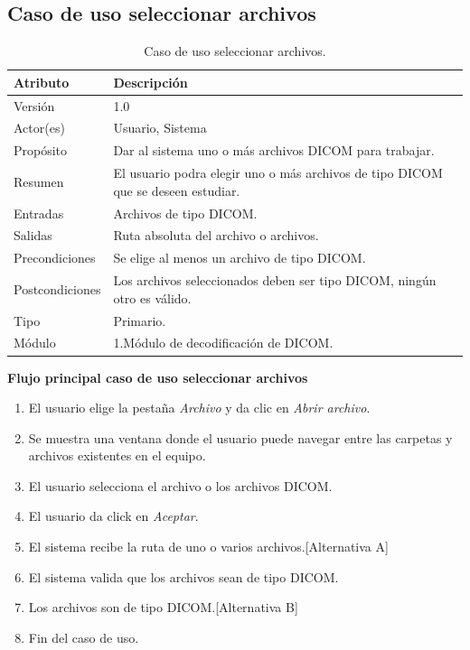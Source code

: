 \documentclass[12pt]{report}
\begin{document}
\subsection{Caso de uso seleccionar archivos}
\begin{table}[H]
\begin{center}
\begin{tabular}{p{30mm}p{80mm}}
\hline
Atributo & Descripción\\
\hline \hline 
Versión & 1.0\\
Actor(es) & Usuario, Sistema\\
Propósito & Dar al sistema uno o más archivos DICOM para trabajar.\\
Resumen & El usuario podra elegir uno o más archivos de tipo DICOM que se deseen estudiar.\\
Entradas & Archivos de tipo DICOM.\\
Salidas & Ruta absoluta del archivo o archivos.\\
Precondiciones & Se elige al menos un archivo de tipo DICOM.\\
Postcondiciones & Los archivos seleccionados deben ser tipo DICOM, ningún otro es válido.\\
Tipo & Primario.\\
Módulo & 1.Módulo de decodificación de DICOM.\\
\hline \hline
\end{tabular}
\caption{Caso de uso seleccionar archivos.}
\end{center}
\end{table}

\textbf{Flujo principal caso de uso seleccionar archivos}
\begin{enumerate}
\item El usuario elige la pestaña \textit{Archivo} y da clic en \textit{Abrir archivo}.
\item Se muestra una ventana donde el usuario puede navegar entre las carpetas y archivos existentes en el equipo.
\item El usuario selecciona el archivo o los archivos DICOM.
\item El usuario da click en \textit{Aceptar}.
\item El sistema recibe la ruta de uno o varios archivos.[Alternativa A]
\item El sistema valida que los archivos sean de tipo DICOM.
\item Los archivos son de tipo DICOM.[Alternativa B]
\item Fin del caso de uso.
\end{enumerate}
\end{document}
